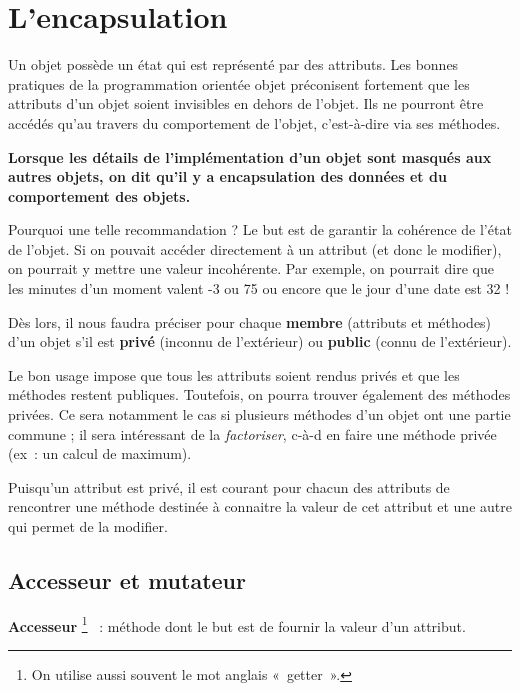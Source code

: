 \section{L'encapsulation}

	Un objet possède un état qui est représenté par des attributs. 
	Les bonnes pratiques de la programmation orientée objet préconisent
	fortement que les attributs d'un objet soient
	invisibles en dehors de l'objet. 
	Ils ne pourront être accédés qu'au travers 
	du comportement de l'objet, 
	c'est-à-dire via ses méthodes.
	
	\textbf{%
		Lorsque les détails de l'implémentation
		d'un objet sont masqués aux autres objets, on dit
		qu'il y a \textbf{encapsulation} des données et du
		comportement des objets.
	}
	
	Pourquoi une telle recommandation ? 
	Le but est de garantir la cohérence de l'état de l'objet. 
	Si on pouvait accéder directement à un attribut 
	(et donc le modifier), 
	on pourrait y mettre une valeur incohérente. 
	Par exemple, on pourrait dire que les minutes d'un moment 
	valent -3 ou 75 ou encore que le jour d'une date est 32 !
	
	Dès lors, il nous faudra préciser pour chaque \textbf{membre} 
	(attributs et méthodes) d'un objet s'il est
	\textbf{privé} (inconnu de l'extérieur) ou
	\textbf{public} (connu de l'extérieur). 
	
	Le bon usage impose que tous les attributs soient rendus privés 
	et que les méthodes restent publiques. 
	Toutefois, on pourra trouver également des méthodes privées. 
	Ce sera notamment le cas si plusieurs méthodes d'un objet 
	ont une partie commune ; 
	il sera intéressant de la \textit{factoriser}, 
	c-à-d en faire une méthode privée (ex~: un calcul de maximum).
	
	Puisqu'un attribut est privé,
	il est courant pour chacun des attributs de rencontrer 
	une méthode destinée à connaitre la valeur de cet attribut 
	et une autre qui permet de la modifier.

	\subsection{Accesseur et mutateur}
	
	
	\textbf{Accesseur}%
	\footnote{On utilise aussi souvent le mot anglais «~getter~».}%
	~: méthode dont le but est de fournir la valeur d'un attribut.

